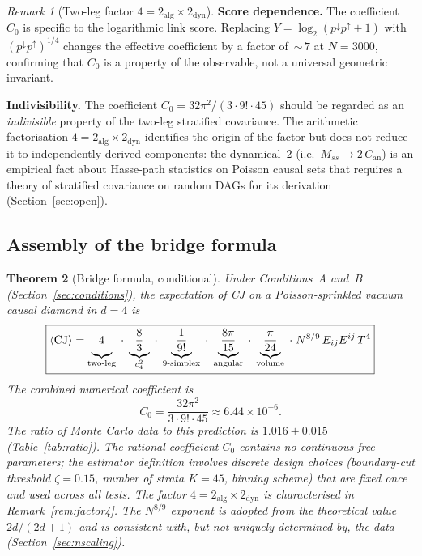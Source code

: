 \documentclass[12pt,a4paper]{article}
\theoremstyle{plain}
\newtheorem{theorem}{Theorem}[section]
\theoremstyle{definition}
\theoremstyle{remark}
\newtheorem{remark}[theorem]{Remark}
\newcommand{\Esq}{E_{ij}E^{ij}}
\newcommand{\CJ}{\mathrm{CJ}}
\begin{document}
\begin{remark}[Two-leg factor $4 = 2_{\mathrm{alg}} \times 2_{\mathrm{dyn}}$]
\medskip\noindent\textbf{Score dependence.}\enspace
The coefficient~$C_0$ is specific to the logarithmic link score.
Replacing $Y = \log_2(p^{\downarrow} p^{\uparrow} + 1)$ with
$(p^{\downarrow} p^{\uparrow})^{1/4}$ changes the effective
coefficient by a factor of~${\sim}\,7$ at $N = 3000$, confirming
that $C_0$ is a property of the observable, not a universal
geometric invariant.

\medskip\noindent\textbf{Indivisibility.}\enspace
The coefficient $C_0 = 32\pi^2/(3 \cdot 9! \cdot 45)$ should
be regarded as an \emph{indivisible} property of the
two-leg stratified covariance.  The arithmetic factorisation
$4 = 2_{\mathrm{alg}} \times 2_{\mathrm{dyn}}$ identifies the
origin of the factor but does not reduce it to independently
derived components: the dynamical~$2$ (i.e.\ $M_{ss} \to
2\,C_{\mathrm{an}}$) is an empirical fact about Hasse-path
statistics on Poisson causal sets that requires a theory of
stratified covariance on random DAGs for its derivation
(Section~\ref{sec:open}).
\end{remark}

\subsection{Assembly of the bridge formula}
\label{sec:assembly}

\begin{theorem}[Bridge formula, conditional]
\label{thm:bridge}
Under Conditions~A and~B (Section~\ref{sec:conditions}), the
expectation of CJ on a Poisson-sprinkled vacuum causal diamond
in $d = 4$ is
\begin{equation}\label{eq:bridge}
  \boxed{
  \langle \CJ \rangle
  = \underbrace{4\vphantom{\frac{8}{3}}}_{\text{two-leg}}
    \;\cdot\;
    \underbrace{\frac{8}{3}}_{c_4^2}
    \;\cdot\;
    \underbrace{\frac{1}{9!}}_{\text{9-simplex}}
    \;\cdot\;
    \underbrace{\frac{8\pi}{15}}_{\text{angular}}
    \;\cdot\;
    \underbrace{\frac{\pi}{24}}_{\text{volume}}
    \;\cdot\;
    N^{8/9}\, \Esq\, T^4
  }
\end{equation}
The combined numerical coefficient is
\begin{equation}\label{eq:C0-full}
  C_0 = \frac{32\pi^2}{3 \cdot 9! \cdot 45}
  \approx 6.44 \times 10^{-6}.
\end{equation}
The ratio of Monte Carlo data to this prediction is
$1.016 \pm 0.015$ (Table~\ref{tab:ratio}).  The rational
coefficient $C_0$ contains no continuous free parameters; the
estimator definition involves discrete design choices (boundary-cut
threshold $\zeta = 0.15$, number of strata $K = 45$, binning
scheme) that are fixed once and used across all tests.  The
factor $4 = 2_{\mathrm{alg}} \times 2_{\mathrm{dyn}}$ is
characterised in Remark~\ref{rem:factor4}.  The $N^{8/9}$ exponent is
adopted from the theoretical value $2d/(2d+1)$ and is consistent
with, but not uniquely determined by, the data
(Section~\ref{sec:nscaling}).
\end{theorem}
\end{document}
